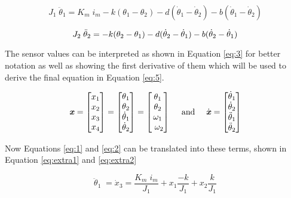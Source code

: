\begin{equation}
J_1 \; \ddot{\theta}_1 = K_m \; i_m - k(\theta_1-\theta_2) - d(\dot{\theta}_1-\dot{\theta}_2) - b(\dot{\theta}_1-\dot{\theta}_2)
\label{eq:1}
\end{equation}

\begin{equation}
J_2 \; \ddot{\theta}_2 = -k(\theta_2-\theta_1) - d(\dot{\theta}_2-\dot{\theta}_1) - b(\dot{\theta}_2-\dot{\theta}_1)
\label{eq:2}
\vspace{.2em}
\end{equation}

The sensor values can be interpreted as shown in Equation \ref{eq:3} for better notation as well as showing the first derivative of them which will be used to derive the final equation in Equation \ref{eq:5}.

\begin{equation}
\label{eq:3}
\text{\textit{\textbf{x}}} =
\begin{bmatrix}
x_1 \\
x_2  \\
x_3  \\
x_4  
\end{bmatrix}
=
\begin{bmatrix}
\theta_1\\
 \theta_2\\
\dot{\theta}_1\\
\dot{\theta}_2
\end{bmatrix}
=
\begin{bmatrix}
\theta_1\\
\theta_2\\
\omega_1\\
\ \omega_2
\end{bmatrix}
\quad\text{ and }\quad
\dot{\text{\textit{\textbf{x}}}} =
\begin{bmatrix}
\dot{\theta}_1\\
\dot{\theta}_2\\
\ddot{\theta}_1\\
\ddot{\theta}_2
\end{bmatrix}
\vspace{.2em}
\end{equation}

Now Equations \ref{eq:1} and \ref{eq:2} can be translated into these terms, shown in Equation \ref{eq:extra1} and \ref{eq:extra2}

\begin{equation}
 \ddot{\theta}_1 \; = \dot{x}_3 = \dfrac{K_m \; i_m}{J_1} + x_1 \frac{-k}{J_1} +  x_2 \frac{k}{J_1}
\label{eq:extra1}
\end{equation}

